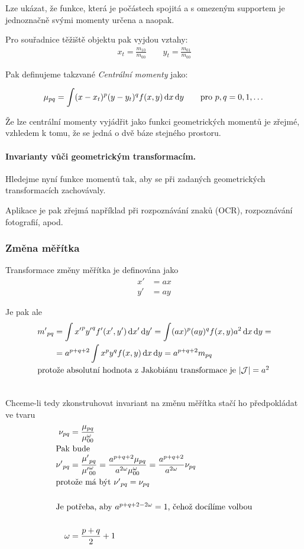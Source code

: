 Lze ukázat, že funkce, která je počástech spojitá a s omezeným supportem je jednoznačně svými momenty určena
a naopak.

Pro souřadnice těžiště objektu pak vyjdou vztahy:
\begin{align}
x_t = \frac{m_{10}}{m_{00}}\qquad
y_t = \frac{m_{01}}{m_{00}}
\end{align}

Pak definujeme takzvané \emph{Centrální momenty} jako:

\begin{equation}
\mu_{pq}=\int (x-x_t)^p(y-y_t)^qf(x,y)\dif x\dif y\qquad \hbox{pro $p,q=0,1,\dots$}
\end{equation}

Že lze centrální momenty vyjádřit jako funkci geometrických momentů je zřejmé, vzhledem k tomu, že se jedná o dvě 
báze stejného prostoru.

\paragraph{Invarianty vůči geometrickým transformacím.}
Hledejme nyní funkce momentů tak, aby se při zadaných geometrických transformacích zachovávaly. 

Aplikace je pak zřejmá například při rozpoznávání znaků (OCR), rozpoznávání fotografií, apod.

\subsubsection{Změna měřítka}
Transformace změny měřítka je definována jako
\begin{align}
x' &= ax\nonumber\\
y' &= ay
\end{align}

Je pak ale
\begin{align}
{m'}_{pq} &= \int {x'}^p{y'}^q{f'}(x',y')\dif x'\dif y'=\int (ax)^p(ay)^qf(x,y)a^2\dif x\dif y=\nonumber\\
 &= a^{p+q+2}\int x^py^qf(x,y)\dif x\dif y=a^{p+q+2} m_{pq}\\
\noalign{\hbox{protože absolutní hodnota z Jakobiánu transformace je $|\mathcal{J}|=a^2$}}\nonumber
\end{align}

Chceme-li tedy zkonstruhovat invariant na změnu měřítka stačí ho předpokládat ve tvaru
\begin{align}
\nu_{pq} &= \frac{\mu_{pq}}{\mu^\omega_{00}}\\
\noalign{\hbox{Pak bude}\nonumber}
{\nu'}_{pq} &= \frac{{\mu'}_{pq}} {{\mu'}^\omega_{00}}=\frac{a^{p+q+2}\mu_{pq}}{a^{2\omega}\mu^\omega_{00}}=
\frac{a^{p+q+2}}{a^{2\omega}}\nu_{pq}\nonumber\\
\noalign{\hbox{protože má být ${\nu'}_{pq}=\nu_{pq}$}\nonumber}\\
\noalign{\hbox{Je potřeba, aby $a^{p+q+2-2\omega}=1$, čehož docílíme volbou}\nonumber}\\
\omega &= \frac{p+q}{2}+1
\end{align}


